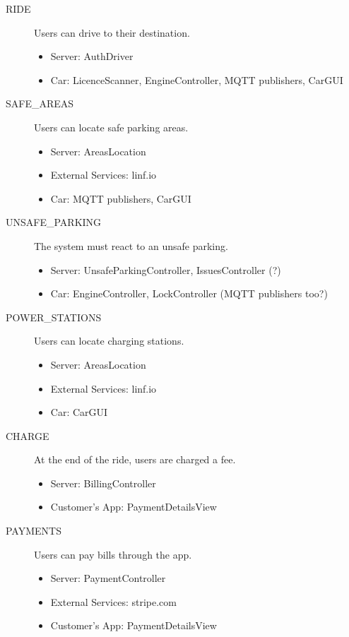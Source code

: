 \documentclass[11pt]{article} %
\begin{document}
\begin{description}
	\item[RIDE] Users can drive to their destination.
	\begin{itemize}
		\item Server: AuthDriver
		\item Car: LicenceScanner, EngineController, MQTT publishers, CarGUI
	\end{itemize}

	\item[SAFE\_AREAS] Users can locate safe parking areas.
	\begin{itemize}
		\item Server: AreasLocation
		\item External Services: linf.io
		\item Car: MQTT publishers, CarGUI
	\end{itemize}

	\item[UNSAFE\_PARKING] The system must react to an unsafe parking.
	\begin{itemize}
		\item Server: UnsafeParkingController, IssuesController (?)
		\item Car: EngineController, LockController (MQTT publishers too?)
	\end{itemize}

	\item[POWER\_STATIONS] Users can locate charging stations.
	\begin{itemize}
		\item Server: AreasLocation
		\item External Services: linf.io
		\item Car: CarGUI
	\end{itemize}

	\item[CHARGE] At the end of the ride, users are charged a fee.
	\begin{itemize}
		\item Server: BillingController
		\item Customer's App: PaymentDetailsView
	\end{itemize}

	\item[PAYMENTS] Users can pay bills through the app.
	\begin{itemize}
		\item Server: PaymentController
		\item External Services: stripe.com
		\item Customer's App: PaymentDetailsView
	\end{itemize}


\end{description}
\end{document}
